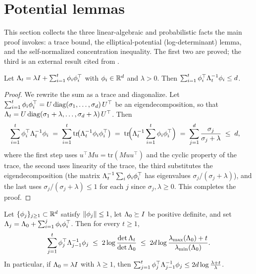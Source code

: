 \section{Potential lemmas}\label{sec:elliptical}

This section collects the three linear-algebraic and probabilistic facts the
main proof invokes: a trace bound, the elliptical-potential (log-determinant)
lemma, and the self-normalized concentration inequality. The first two are
proved; the third is an external result cited from \cite{abbasi2011improved}.

\begin{lemma}\label{lem:trace-bound}
Let $\Lambda_t=\lambda I+\sum_{i=1}^t \phi_i\phi_i^\top$ with
$\phi_i\in\mathbb{R}^d$ and $\lambda>0$. Then $\sum_{i=1}^t \phi_i^\top
\Lambda_t^{-1}\phi_i\le d$.
\end{lemma}

\begin{proof}
We rewrite the sum as a trace and diagonalize. Let $\sum_{i=1}^t \phi_i
\phi_i^\top=U\,\mathrm{diag}(\sigma_1,\dots,\sigma_d)\,U^\top$ be an
eigendecomposition, so that $\Lambda_t=U\,\mathrm{diag}(\sigma_1+\lambda,\dots,
\sigma_d+\lambda)\,U^\top$. Then
\begin{align*}
\sum_{i=1}^t \phi_i^\top \Lambda_t^{-1}\phi_i
&\;=\; \sum_{i=1}^t \mathrm{tr}\!\big( \Lambda_t^{-1}\phi_i\phi_i^\top \big)
\;=\; \mathrm{tr}\!\Big( \Lambda_t^{-1}\sum_{i=1}^t \phi_i\phi_i^\top \Big)
\;=\; \sum_{j=1}^d \frac{\sigma_j}{\sigma_j+\lambda}
\;\le\; d,
\end{align*}
where the first step uses $u^\top M u=\mathrm{tr}(Muu^\top)$ and the cyclic
property of the trace, the second uses linearity of the trace, the third
substitutes the eigendecomposition (the matrix $\Lambda_t^{-1}\sum_i\phi_i
\phi_i^\top$ has eigenvalues $\sigma_j/(\sigma_j+\lambda)$), and the last
uses $\sigma_j/(\sigma_j+\lambda)\le1$ for each $j$ since $\sigma_j,\lambda\ge0$.
This completes the proof.
\end{proof}

\begin{lemma}\label{lem:elliptical}
Let $\{\phi_j\}_{j\ge1}\subset\mathbb{R}^d$ satisfy $\left\| \phi_j \right\|\le1$, let
$\Lambda_0\succeq I$ be positive definite, and set $\Lambda_j=\Lambda_0+\sum_{i=1}^j
\phi_i\phi_i^\top$. Then for every $t\ge1$,
\begin{align}\label{eq:elliptical}
\sum_{j=1}^t \phi_j^\top \Lambda_{j-1}^{-1}\phi_j
\;\le\; 2\log\frac{\det\Lambda_t}{\det\Lambda_0}
\;\le\; 2d\log\frac{\lambda_{\max}(\Lambda_0)+t}{\lambda_{\min}(\Lambda_0)}.
\end{align}
In particular, if $\Lambda_0=\lambda I$ with $\lambda\ge1$, then
$\sum_{j=1}^t \phi_j^\top \Lambda_{j-1}^{-1}\phi_j\le 2d\log\frac{\lambda+t}
{\lambda}$.
\end{lemma}

